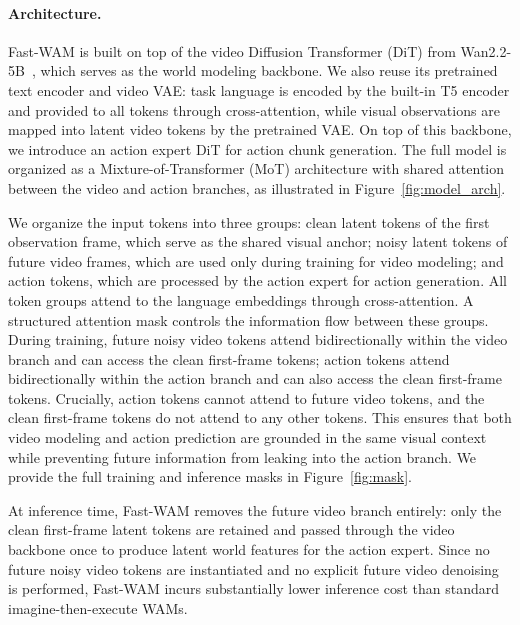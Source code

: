 \documentclass{article}
\begin{document}
\paragraph{Architecture.}
Fast-WAM is built on top of the video Diffusion Transformer (DiT) from Wan2.2-5B~\cite{wan2025}, which serves as the world modeling backbone. We also reuse its pretrained text encoder and video VAE: task language is encoded by the built-in T5 encoder and provided to all tokens through cross-attention, while visual observations are mapped into latent video tokens by the pretrained VAE. On top of this backbone, we introduce an action expert DiT for action chunk generation. The full model is organized as a Mixture-of-Transformer (MoT) architecture with shared attention between the video and action branches, as illustrated in Figure~\ref{fig:model_arch}.

We organize the input tokens into three groups: clean latent tokens of the first observation frame, which serve as the shared visual anchor; noisy latent tokens of future video frames, which are used only during training for video modeling; and action tokens, which are processed by the action expert for action generation. All token groups attend to the language embeddings through cross-attention. A structured attention mask controls the information flow between these groups. During training, future noisy video tokens attend bidirectionally within the video branch and can access the clean first-frame tokens; action tokens attend bidirectionally within the action branch and can also access the clean first-frame tokens. Crucially, action tokens cannot attend to future video tokens, and the clean first-frame tokens do not attend to any other tokens. This ensures that both video modeling and action prediction are grounded in the same visual context while preventing future information from leaking into the action branch. We provide the full training and inference masks in Figure~\ref{fig:mask}.

At inference time, Fast-WAM removes the future video branch entirely: only the clean first-frame latent tokens are retained and passed through the video backbone once to produce latent world features for the action expert. Since no future noisy video tokens are instantiated and no explicit future video denoising is performed, Fast-WAM incurs substantially lower inference cost than standard imagine-then-execute WAMs.
\end{document}
